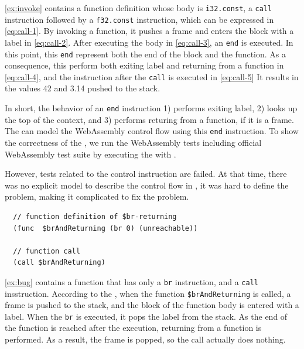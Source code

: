 \cref{ex:invoke} contains a function definition whose body is \texttt{i32.const}, a
\texttt{call} instruction followed by a \texttt{f32.const} instruction, which
can be expressed in \cref{eq:call-1}.
By invoking a function, it pushes a frame and enters the block with a label in
\cref{eq:call-2}.
After executing the body in \cref{eq:call-3}, an \texttt{end} is executed.
In this point, this \texttt{end} represent both the end of the block and the
function.
As a consequence, this  perform both exiting label and returning from
a function in \cref{eq:call-4}, and the instruction after the \texttt{call} is
executed in \cref{eq:call-5}
It results in the values 42 and 3.14 pushed to the stack.


In short, the behavior of an \texttt{end} instruction 1) performs exiting
label, 2) looks up the top of the context, and 3) performs returing from a
function, if it is a frame.
The \spectecp{} can model the WebAssembly control flow using this \texttt{end}
instruction.
To show the correctness of the \spectecp{}, we run the WebAssembly tests
including official WebAssembly test suite by executing the \spectecp{} with
.


However, tests related to the control instruction are failed.
At that time, there was no explicit model to describe the control flow in
\spectecp{}, it was hard to define the problem, making it complicated to fix
the problem.




\begin{example}
\label{ex:bug}
\begin{verbatim}
  // function definition of $br-returning
  (func  $brAndReturning (br 0) (unreachable))

  // function call
  (call $brAndReturning)
\end{verbatim}
\end{example}

\cref{ex:bug} contains a function that has only a \texttt{br} instruction, and a
\texttt{call} insstruction.
According to the \officialp{}, when the function \texttt{\$brAndReturning} is
called, a frame is pushed to the stack, and the block of the function
body is entered with a label.
When the \texttt{br} is executed, it pops the label from the stack.
As the end of the function is reached after the execution, returning from a
function is performed.
As a result, the frame is popped, so the call actually does nothing.



